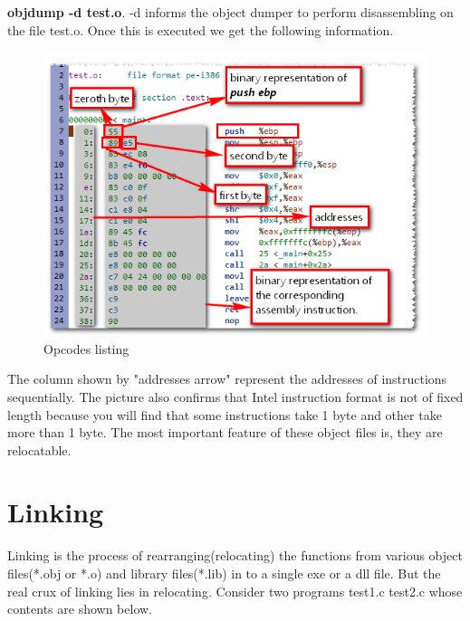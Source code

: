 \documentclass{article}
\begin{document}
{\textbf{objdump -d test.o}}. -d informs the object dumper to perform disassembling on the file test.o. Once this is executed we get the following information.

\begin{figure}[H]
\centering
\includegraphics[width=\textwidth]{Assembling1.png}
\caption{Opcodes listing}
\end{figure}
The column shown by "addresses arrow" represent the addresses of instructions sequentially. The picture also confirms that Intel instruction format is not of fixed length because you will find that some instructions take 1 byte and other take more than 1 byte. The most important feature of these object files is, they are relocatable.
\section{Linking}
Linking is the process of rearranging(relocating) the functions from various object files(*.obj or *.o) and library files(*.lib) in to a single exe or a dll file. But the real crux of linking lies in relocating. Consider two programs test1.c test2.c whose contents are shown below.
\end{document}
